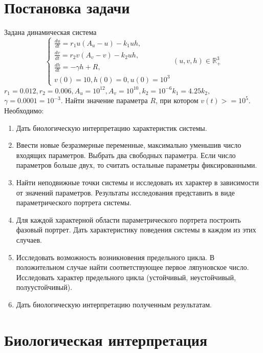 \documentclass[11pt]{article}
\begin{document}
\section{Постановка задачи}
Задана динамическая система
\begin{equation*}
\begin{cases}
\frac{du}{dt} = r_1u (A_u - u) - k_1uh, \\
\frac{dv}{dt} = r_2v (A_v - v) - k_2uh, \\
\frac{dh}{dt} = - \gamma h + R, \\
v(0) = 10, h(0) = 0, u(0) = 10^3
\end{cases}
(u,v,h) \in \mathbb{R}^3_+
\end{equation*}
$ r_1 = 0.012,r_2 = 0.006, A_u = 10^{12}, A_v = 10^{10}, k_2 = 10^{-6} 
  k_1 = 4.25 k_2,$ \\ $ \gamma = 0.0001 = 10^{-3}.$
Найти значение параметра $R$, при котором $v(t) >= 10^{5}$. \\
Необходимо:
\begin{enumerate}
    \item Дать биологическую интерпретацию характеристик системы.
    \item Ввести новые безразмерные переменные, максимально уменьшив число входящих параметров. Выбрать два свободных параметра. Если число параметров больше двух, то считать остальные параметры фиксированными.
    \item Найти неподвижные точки системы и исследовать их характер в зависимости от значений параметров. Результаты исследования представить в виде параметрического портрета системы.
    \item Для каждой характерной области параметрического портрета построить фазовый портрет. Дать характеристику поведения системы в каждом из этих случаев.
    \item Исследовать возможность возникновения предельного цикла. В положительном случае найти соответствующее первое ляпуновское число. Исследовать характер предельного цикла (устойчивый, неустойчивый, полуустойчивый).
    \item Дать биологическую интерпретацию полученным результатам.
\end{enumerate}
\section{Биологическая интерпретация}
\end{document}
